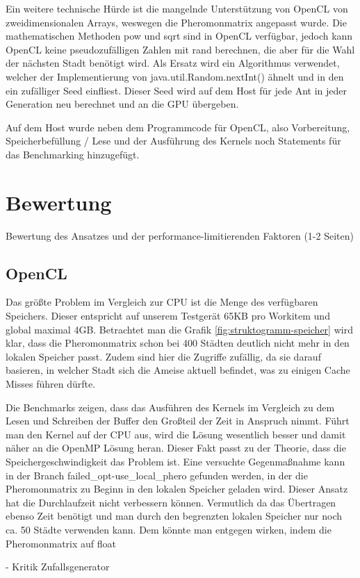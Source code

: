 Ein weitere technische Hürde ist die mangelnde Unterstützung von OpenCL von zweidimensionalen Arrays, weswegen die Pheromonmatrix angepasst wurde.
Die mathematischen Methoden pow und sqrt sind in OpenCL verfügbar, jedoch kann OpenCL keine pseudozufälligen Zahlen mit rand berechnen, die aber für die Wahl der nächsten Stadt benötigt wird.
Als Ersatz wird ein Algorithmus verwendet, welcher der Implementierung von java.util.Random.nextInt() ähnelt und in den ein zufälliger Seed einfliest.
Dieser Seed wird auf dem Host für jede Ant in jeder Generation neu berechnet und an die GPU übergeben.

Auf dem Host wurde neben dem Programmcode für OpenCL, also Vorbereitung, Speicherbefüllung / Lese und der Ausführung des Kernels noch Statements für das Benchmarking hinzugefügt.

\section{Bewertung}
Bewertung des Ansatzes und der performance-limitierenden Faktoren (1-2 Seiten)

\subsection{OpenCL}
Das größte Problem im Vergleich zur CPU ist die Menge des verfügbaren Speichers.
Dieser entspricht auf unserem Testgerät 65KB pro Workitem und global maximal 4GB.
Betrachtet man die Grafik \ref{fig:struktogramm-speicher} wird klar, dass die Pheromonmatrix schon bei 400 Städten deutlich nicht mehr in den lokalen Speicher passt.
Zudem sind hier die Zugriffe zufällig, da sie darauf basieren, in welcher Stadt sich die Ameise aktuell befindet, was zu einigen Cache Misses führen dürfte.

Die Benchmarks zeigen, dass das Ausführen des Kernels im Vergleich zu dem Lesen und Schreiben der Buffer den Großteil der Zeit in Anspruch nimmt.
Führt man den Kernel auf der CPU aus, wird die Lösung wesentlich besser und damit näher an die OpenMP Lösung heran.
Dieser Fakt passt zu der Theorie, dass die Speichergeschwindigkeit das Problem ist.
Eine versuchte Gegenmaßnahme kann in der Branch failed_opt-use_local_phero gefunden werden, in der die Pheromonmatrix zu Beginn in den lokalen Speicher geladen wird.
Dieser Ansatz hat die Durchlaufzeit nicht verbessern können.
Vermutlich da das Übertragen ebenso Zeit benötigt und man durch den begrenzten lokalen Speicher nur noch ca. 50 Städte verwenden kann.
Dem könnte man entgegen wirken, indem die Pheromonmatrix auf float

- Kritik Zufallsgenerator